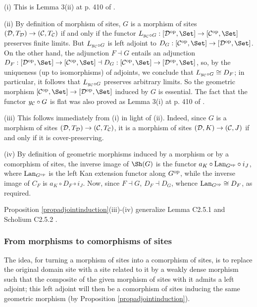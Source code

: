 \documentclass[a4paper,12pt]{article}
\begin{document}
\begin{proofs}
	(i) This is Lemma 3(ii) at p. 410 of \cite{MM}. 
	
	(ii) By definition of morphism of sites, $G$ is a morphism of sites $({\cal D}, T_{\cal D})\to ({\cal C}, T_{\cal C})$ if and only if the functor $L_{y_{\cal C}\circ G}:[{\cal D}^{\textup{op}}, \Set] \to [{\cal C}^{\textup{op}}, \Set]$ preserves finite limits. But $L_{y_{\cal C}\circ G}$ is left adjoint to $D_{G}:[{\cal C}^{\textup{op}}, \Set] \to [{\cal D}^{\textup{op}}, \Set]$. On the other hand, the adjunction $F\dashv G$ entails an adjunction $D_{F}:[{\cal D}^{\textup{op}}, \Set] \to [{\cal C}^{\textup{op}}, \Set] \dashv D_{G}:[{\cal C}^{\textup{op}}, \Set] \to [{\cal D}^{\textup{op}}, \Set]$, so, by the uniqueness (up to isomorphisms) of adjoints, we conclude that $L_{y_{\cal C}\circ G}\cong D_{F}$; in particular, it follows that $L_{y_{\cal C}\circ G}$ preserves arbitrary limits. So the geometric morphism $[{\cal C}^{\textup{op}}, \Set]\to [{\cal D}^{\textup{op}}, \Set]$ induced by $G$ is essential. The fact that the functor $y_{\cal C}\circ G$ is flat was also proved as Lemma 3(i) at p. 410 of \cite{MM}.  
	
	(iii) This follows immediately from (i) in light of (ii). Indeed, since $G$ is a morphism of sites $({\cal D}, T_{\cal D})\to ({\cal C}, T_{\cal C})$, it is a morphism of sites  $({\cal D}, K) \to ({\cal C}, J)$ if and only if it is cover-preserving.
	
	(iv) By definition of geometric morphisms induced by a morphism or by a comorphism of sites, the inverse image of $\Sh(G)$ is the functor $a_{K}\circ \textup{Lan}_{G^{\textup{op}}}\circ i_{J}$, where $\textup{Lan}_{G^{\textup{op}}}$ is the left Kan extension functor along $G^{\textup{op}}$, while the inverse image of $C_{F}$ is $a_{K}\circ D_{F}\circ i_{J}$. Now, since $F\dashv G$, $D_{F}\dashv D_{G}$, whence $\textup{Lan}_{G^{\textup{op}}}\cong D_{F}$, as required.  
\end{proofs}

\begin{remark}
	Proposition \ref{propadjointinduction}(iii)-(iv) generalize Lemma C2.5.1 and Scholium C2.5.2 \cite{El}.	   
\end{remark}

\subsubsection{From morphisms to comorphisms of sites}

The idea, for turning a morphism of sites into a comorphism of sites, is to replace the original domain site with a site related to it by a weakly dense morphism such that the composite of the given morphism of sites with it admits a left adjoint; this left adjoint will then be a comorphism of sites inducing the same geometric morphism (by Proposition \ref{propadjointinduction}).
\end{document}
